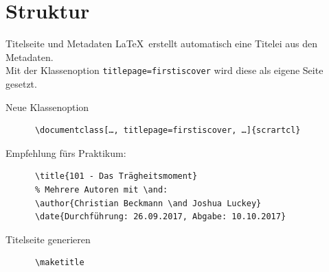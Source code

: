 \section{Struktur}

\begin{frame}[fragile]{Titelseite und Metadaten}
  \LaTeX\ erstellt automatisch eine Titelei aus den Metadaten. \\
  Mit der Klassenoption \texttt{titlepage=firstiscover} wird diese  als eigene Seite gesetzt.

  \begin{block}{Neue Klassenoption}
    \begin{verbatim}
      \documentclass[…, titlepage=firstiscover, …]{scrartcl}
    \end{verbatim}
  \end{block}

  \begin{block}{Empfehlung fürs Praktikum:}
    \begin{verbatim}
      \title{101 - Das Trägheitsmoment}
      % Mehrere Autoren mit \and:
      \author{Christian Beckmann \and Joshua Luckey}
      \date{Durchführung: 26.09.2017, Abgabe: 10.10.2017}
    \end{verbatim}
  \end{block}

  \begin{block}{Titelseite generieren}
    \begin{verbatim}
      \maketitle
    \end{verbatim}
  \end{block}
\end{frame}

